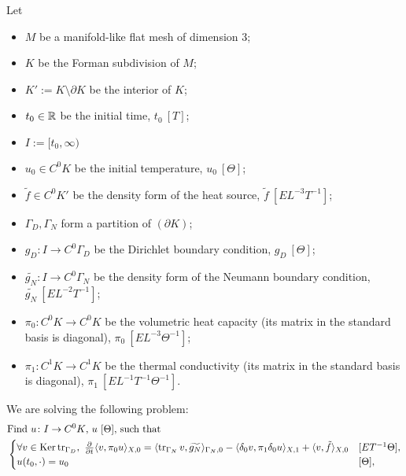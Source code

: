 \begin{formulation}
  Let
  \begin{itemize}
    \item
      $M$ be a manifold-like flat mesh of dimension $3$;
    \item
      $K$ be the Forman subdivision of $M$;
    \item
      $K' := K \setminus \partial K$ be the interior of $K$;
    \item
      $t_0 \in \mathbb{R}$ be the initial time, $t_0\ [T]$;
    \item
      $I := [t_0, \infty)$
    \item
      $u_0 \in C^0 K$ be the initial temperature, $u_0\ [\Theta]$;
    \item
      $\tilde{f} \in C^0 K'$ be the density form of the heat source,
      $\tilde{f}\ [E L^{-3} T^{-1}]$;
    \item
      $\Gamma_D, \Gamma_N$ form a partition of $(\partial K)$;
    \item
      $g_D \colon I \to C^0 \Gamma_D$
      be the Dirichlet boundary condition, $g_D\ [\Theta]$;
    \item
      $\widetilde{g_N} \colon I \to C^0 \Gamma_N$
      be the density form of the Neumann boundary condition,
      $\widetilde{g_N}\ [E L^{-2} T^{-1}]$;
    \item
      $\pi_0 \colon C^0 K \to C^0 K$ be the volumetric heat capacity
      (its matrix in the standard basis is diagonal),
      $\pi_0\ [E L^{-3} \Theta^{-1}]$;
    \item
      $\pi_1 \colon C^1 K \to C^1 K$ be the thermal conductivity
      (its matrix in the standard basis is diagonal),
      $\pi_1\ [E L^{-1} T^{-1} \Theta^{-1}]$.
  \end{itemize}
  We are solving the following problem:
  \begin{equation}
    \begin{split}
      & \text{Find $u \colon I \to C^0 K$, $u\ [\Theta]$, such that} \\
      &
      \begin{cases}
        \forall v \in \mathop{\rm Ker}\nolimits \mathop{\rm tr}\nolimits_{\Gamma_D},\
          \frac{\partial}{\partial t} \langle v,\pi_0 u\rangle_{X, 0} =
            \langle\mathop{\rm tr}\nolimits_{\Gamma_N} v,\widetilde{g_N}\rangle_{\Gamma_N, 0}
          - \langle\delta_0 v,\pi_1 \delta_0 u\rangle_{X, 1}
          + \langle v,\tilde{f}\rangle_{X, 0} 
        & [E T^{-1} \Theta], \\
        u(t_0, \cdot) = u_0 & [\Theta], \\

\end{cases}
\end{split}
\end{equation}
\end{formulation}

